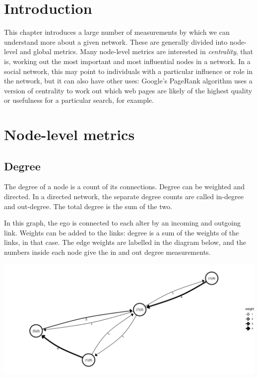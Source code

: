 \documentclass[
]{book}
\begin{document}
\hypertarget{introduction-1}{%
\section{Introduction}\label{introduction-1}}

This chapter introduces a large number of measurements by which we can understand more about a given network. These are generally divided into node-level and global metrics. Many node-level metrics are interested in \emph{centrality}, that is, working out the most important and most influential nodes in a network. In a social network, this may point to individuals with a particular influence or role in the network, but it can also have other uses: Google's PageRank algorithm uses a version of centrality to work out which web pages are likely of the highest quality or usefulness for a particular search, for example.

\hypertarget{node-level-metrics}{%
\section{Node-level metrics}\label{node-level-metrics}}

\hypertarget{degree}{%
\subsection{Degree}\label{degree}}

The degree of a node is a count of its connections. Degree can be weighted and directed. In a directed network, the separate degree counts are called in-degree and out-degree. The total degree is the sum of the two.

In this graph, the ego is connected to each alter by an incoming and outgoing link. Weights can be added to the links: degree is a sum of the weights of the links, in that case. The edge weights are labelled in the diagram below, and the numbers inside each node give the in and out degree measurements.

\includegraphics{images/degree.png}
\end{document}
